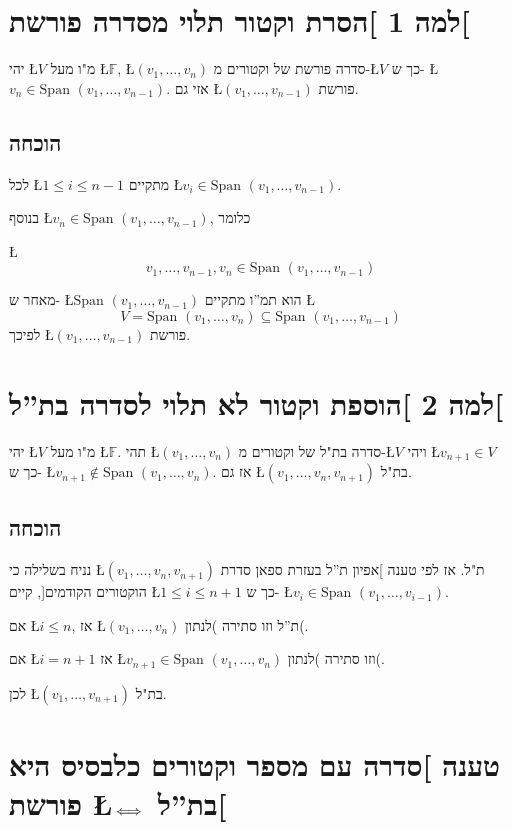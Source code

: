 \documentclass[english,hebrew]{article}
\newcommand{\spn}{\text{Span }}
\begin{document}
\section{למה 1 {]}הסרת וקטור תלוי מסדרה פורשת{[}}

יהי \L{$V$} מ"ו מעל \L{$\mathbb{F}$}, \L{$(v_{1},\dots,v_{n})$}
סדרה פורשת של וקטורים מ-\L{$V$} כך ש- \L{$v_{n}\in\spn(v_{1},\dots,v_{n-1})$}.
אזי גם \L{$(v_{1},\dots,v_{n-1})$} פורשת.

\subsection{הוכחה}

לכל \L{$1\le i\le n-1$} מתקיים \L{$v_{i}\in\spn(v_{1},\dots,v_{n-1})$}.

בנוסף \L{$v_{n}\in\spn(v_{1},\dots,v_{n-1})$}, כלומר

\L{%
\[
v_{1},\dots,v_{n-1},v_{n}\in\spn(v_{1},\dots,v_{n-1})
\]
}%

מאחר ש- \L{$\spn(v_{1},\dots,v_{n-1})$} הוא תמ\textquotedblright ו
מתקיים \L{%
\[
V=\spn(v_{1},\dots,v_{n})\subseteq\spn(v_{1},\dots,v_{n-1})
\]
}%
לפיכך \L{$(v_{1},\dots,v_{n-1})$} פורשת.

\section{למה 2 {]}הוספת וקטור לא תלוי לסדרה בת\textquotedblright ל{[}}

יהי \L{$V$} מ"ו מעל \L{$\mathbb{F}$}. תהי \L{$(v_{1},\dots,v_{n})$}
סדרה בת"ל של וקטורים מ-\L{$V$} ויהי \L{$v_{n+1}\in V$} כך ש- \L{$v_{n+1}\notin\spn(v_{1},\dots,v_{n})$}.
אז גם \L{$(v_{1},\dots,v_{n},v_{n+1})$} בת"ל.

\subsection{הוכחה}

נניח בשלילה כי \L{$(v_{1},\dots,v_{n},v_{n+1})$} ת"ל. אז לפי טענה
{]}אפיון ת\textquotedblright ל בעזרת ספאן סדרת הוקטורים הקודמים{[},
קיים \L{$1\le i\le n+1$} כך ש- \L{$v_{i}\in\spn(v_{1},\dots,v_{i-1})$}.

אם \L{$i\le n$}, אז \L{$(v_{1},\dots,v_{n})$} ת\textquotedblright ל
וזו סתירה )לנתון(. 

אם \L{$i=n+1$} אז \L{$v_{n+1}\in\spn(v_{1},\dots,v_{n})$} וזו סתירה
)לנתון(.

לכן \L{$(v_{1},\dots,v_{n+1})$} בת"ל.

\section{טענה {]}סדרה עם מספר וקטורים כלבסיס היא פורשת \L{$\text{\ensuremath{\protect\iff}}$}
בת\textquotedblright ל{[}}
\end{document}
